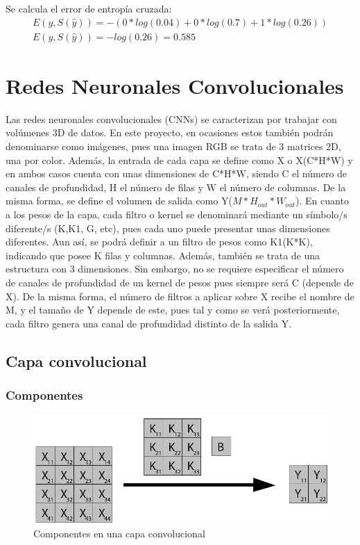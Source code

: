 Se calcula el error de entropía cruzada: \\

\begin{gather}
	 E(y, S(\hat{y})) = - (0*log(0.04) + 0*log(0.7) + 1*log(0.26)) \\
	 E(y, S(\hat{y})) = -log(0.26) = 0.585
\end{gather}

\cite{Cross_entropy_backprop}

\section{Redes Neuronales Convolucionales}

Las redes neuronales convolucionales (CNNs) se caracterizan por trabajar con volúmenes 3D de datos. En este proyecto, en ocasiones estos también podrán denominarse como imágenes, pues una imagen RGB se trata de 3 matrices 2D, una por color. Además, la entrada de cada capa se define como X o X(C*H*W) y en ambos casos cuenta con unas dimensiones de C*H*W, siendo C el número de canales de profundidad, H el número de filas y W el número de columnas. De la misma forma, se define el volumen de salida como Y($M*H_{out}*W_{out}$). En cuanto a los pesos de la capa, cada filtro o kernel se denominará mediante un símbolo/s diferente/s (K,K1, G, etc), pues cada uno puede presentar unas dimensiones diferentes. Aun así, se podrá definir a un filtro de pesos como K1(K*K), indicando que posee K filas y columnas. Además, también se trata de una estructura con 3 dimensiones. Sin embargo, no se requiere especificar el número de canales de profundidad de un kernel de pesos pues siempre será C (depende de X). De la misma forma, el número de filtros a aplicar sobre X recibe el nombre de M, y el tamaño de Y depende de este, pues tal y como se verá posteriormente, cada filtro genera una canal de profundidad distinto de la salida Y. 

\subsection{Capa convolucional}

\subsubsection{Componentes}


\begin{figure}[H]
	\centering
	\includegraphics[scale=0.35]{imagenes/conv_nombres.jpg}  
	\caption{Componentes en una capa convolucional}
	\label{fig:Componentes_convolucion}
\end{figure}

